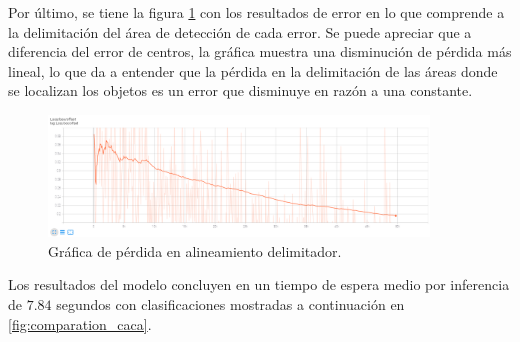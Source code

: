 \documentclass[letter,12pt]{report}
\begin{document}
Por último, se tiene la figura \ref{fig:offset} con los resultados de error en lo que comprende
a la delimitación del área de detección de cada error. Se puede apreciar que a diferencia del
error de centros, la gráfica muestra una disminución de pérdida más lineal, lo que da a 
entender que la pérdida en la delimitación de las áreas donde se localizan los objetos es un
error que disminuye en razón a una constante.

\begin{figure}[ht]
    \centering
    \includegraphics[width=0.9\textwidth]{offset}
    \caption{Gráfica de pérdida en alineamiento delimitador.}
    \label{fig:offset}
\end{figure}

Los resultados del modelo concluyen en un tiempo de espera medio por inferencia de $7.84$
segundos con clasificaciones mostradas a continuación en \ref{fig:comparation_caca}.
\end{document}
